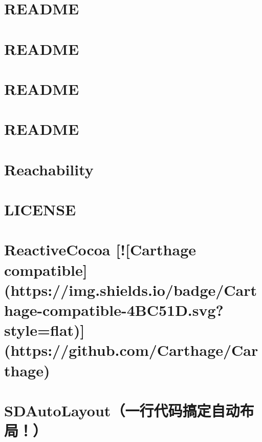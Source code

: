 \documentclass[twoside]{book}
\newcommand{\+}{\discretionary{\mbox{\scriptsize$\hookleftarrow$}}{}{}}
\begin{document}
\chapter{R\+E\+A\+D\+ME}
\label{md__pods__k_v_n_progress__r_e_a_d_m_e}

\chapter{R\+E\+A\+D\+ME}
\label{md__pods__m_j_extension__r_e_a_d_m_e}

\chapter{R\+E\+A\+D\+ME}
\label{md__pods__m_j_refresh__r_e_a_d_m_e}

\chapter{R\+E\+A\+D\+ME}
\label{md__pods_pop__r_e_a_d_m_e}

\chapter{Reachability}
\label{md__pods__reachability__r_e_a_d_m_e}

\chapter{L\+I\+C\+E\+N\+SE}
\label{md__pods__reactive_cocoa__l_i_c_e_n_s_e}

\chapter{Reactive\+Cocoa \mbox{[}!\mbox{[}Carthage compatible\mbox{]}(https\+://img.shields.\+io/badge/\+Carthage-\/compatible-\/4\+B\+C51D.svg?style=flat)\mbox{]}(https\+://github.com/\+Carthage/\+Carthage)}
\label{md__pods__reactive_cocoa__r_e_a_d_m_e}

\chapter{S\+D\+Auto\+Layout（一行代码搞定自动布局！）}
\label{md__pods__s_d_auto_layout__r_e_a_d_m_e}

\end{document}
